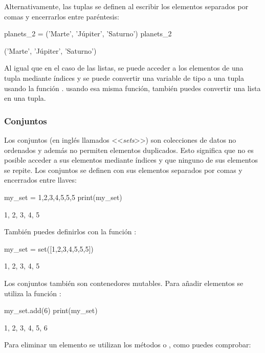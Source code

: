 Alternativamente, las tuplas se definen al escribir los elementos separados por comas y encerrarlos entre paréntesis:

\begin{pyin}
planets_2 = ('Marte', 'Júpiter', 'Saturno')
planets_2
\end{pyin}
\begin{pyout}
('Marte', 'Júpiter', 'Saturno')
\end{pyout}

Al igual que en el caso de las listas, se puede acceder a los elementos de una tupla mediante índices y se puede convertir una variable de tipo  a una tupla usando la función . usando esa misma función, también puedes convertir una lista en una tupla.

\subsubsection{Conjuntos}
Los conjuntos (en inglés llamados <<\emph{sets}>>) son colecciones de datos no ordenados y además no permiten elementos duplicados. Esto significa que no es posible acceder a sus elementos mediante índices y que ninguno de sus elementos se repite. Los conjuntos se definen con sus elementos separados por comas y encerrados entre llaves:

\begin{pyin}
my_set = {1,2,3,4,5,5,5}
print(my_set)
\end{pyin}
\begin{pyprint}
{1, 2, 3, 4, 5}
\end{pyprint}

También puedes definirlos con la función :
\begin{pyin}
my_set = set([1,2,3,4,5,5,5])
\end{pyin}
\begin{pyprint}
{1, 2, 3, 4, 5}
\end{pyprint}

Los conjuntos también son contenedores mutables. Para añadir elementos se utiliza la función :
\begin{pyin}
my_set.add(6)
print(my_set)
\end{pyin}
\begin{pyprint}
{1, 2, 3, 4, 5, 6}
\end{pyprint}

Para eliminar un elemento se utilizan los métodos  o , como puedes comprobar:

